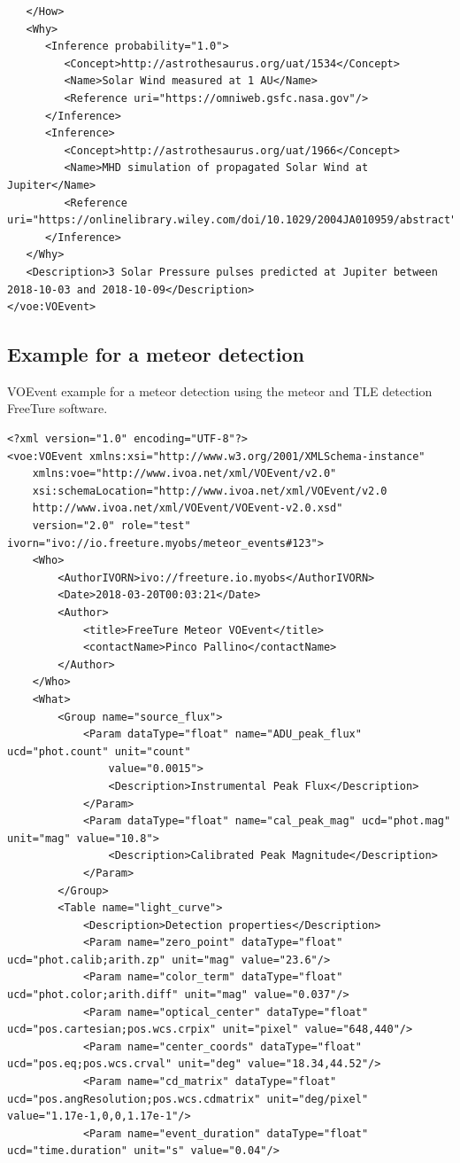 \documentclass[referee,a4paper,12pt,traditabstract]{swsc}
\begin{document}
\begin{linenumbers}
{\begin{verbatim}
   </How>
   <Why>
      <Inference probability="1.0">
         <Concept>http://astrothesaurus.org/uat/1534</Concept>
         <Name>Solar Wind measured at 1 AU</Name>
         <Reference uri="https://omniweb.gsfc.nasa.gov"/>
      </Inference>
      <Inference>
         <Concept>http://astrothesaurus.org/uat/1966</Concept>
         <Name>MHD simulation of propagated Solar Wind at Jupiter</Name>
         <Reference uri="https://onlinelibrary.wiley.com/doi/10.1029/2004JA010959/abstract"/>
      </Inference>
   </Why>
   <Description>3 Solar Pressure pulses predicted at Jupiter between 2018-10-03 and 2018-10-09</Description>
</voe:VOEvent>
\end{verbatim}
}

\subsection{Example for a meteor detection}
\label{appendix-xml-voevent-meteor-freeture}
VOEvent example for a meteor detection using the meteor and TLE detection FreeTure \cite{2014pim4.conf...39A} software.

{\tiny 
\begin{verbatim}
<?xml version="1.0" encoding="UTF-8"?>
<voe:VOEvent xmlns:xsi="http://www.w3.org/2001/XMLSchema-instance"
    xmlns:voe="http://www.ivoa.net/xml/VOEvent/v2.0"
    xsi:schemaLocation="http://www.ivoa.net/xml/VOEvent/v2.0
    http://www.ivoa.net/xml/VOEvent/VOEvent-v2.0.xsd"
    version="2.0" role="test" ivorn="ivo://io.freeture.myobs/meteor_events#123">
    <Who>
        <AuthorIVORN>ivo://freeture.io.myobs</AuthorIVORN>
        <Date>2018-03-20T00:03:21</Date>
        <Author>
            <title>FreeTure Meteor VOEvent</title>
            <contactName>Pinco Pallino</contactName>
        </Author>
    </Who>
    <What>
        <Group name="source_flux">
            <Param dataType="float" name="ADU_peak_flux" ucd="phot.count" unit="count"
                value="0.0015">
                <Description>Instrumental Peak Flux</Description>
            </Param>
            <Param dataType="float" name="cal_peak_mag" ucd="phot.mag" unit="mag" value="10.8">
                <Description>Calibrated Peak Magnitude</Description>
            </Param>
        </Group>
        <Table name="light_curve">
            <Description>Detection properties</Description>
            <Param name="zero_point" dataType="float" ucd="phot.calib;arith.zp" unit="mag" value="23.6"/>
            <Param name="color_term" dataType="float" ucd="phot.color;arith.diff" unit="mag" value="0.037"/>
            <Param name="optical_center" dataType="float" ucd="pos.cartesian;pos.wcs.crpix" unit="pixel" value="648,440"/>
            <Param name="center_coords" dataType="float" ucd="pos.eq;pos.wcs.crval" unit="deg" value="18.34,44.52"/>
            <Param name="cd_matrix" dataType="float" ucd="pos.angResolution;pos.wcs.cdmatrix" unit="deg/pixel" value="1.17e-1,0,0,1.17e-1"/>
            <Param name="event_duration" dataType="float" ucd="time.duration" unit="s" value="0.04"/>


\end{verbatim}}
\end{linenumbers}
\end{document}
